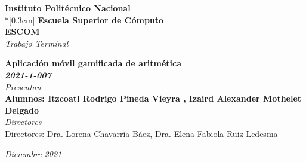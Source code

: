 \documentclass{article}
\begin{document}
\begin{titlepage}


        \begin{center}
            \huge \textbf{Instituto Politécnico Nacional}\\*[0.3cm]
            \LARGE \textbf{Escuela Superior de Cómputo}\\
            \vspace{1cm}
            \hspace{0.9cm}
            \LARGE \textbf{ESCOM}\\
            \vspace{2cm} 
            \Large \emph{Trabajo Terminal}
     
    		\LARGE \textbf{ Aplicación móvil gamificada de aritmética\\}
    		\LARGE \textbf {\emph{ 2021-1-007}} \\
    		\vspace{1cm} %
 		\emph{Presentan}\\   	
    	\textbf{Alumnos: Itzcoatl Rodrigo Pineda Vieyra , Izaird Alexander Mothelet Delgado }\\
    	\vspace{3cm}
    	\emph{Directores}\\   	
	Directores: Dra. Lorena Chavarría Báez, Dra. Elena Fabiola  Ruiz Ledesma \\
    \vspace{1cm} %
        \end{center}

    \centering %
    \vspace{1cm} %
	
	\begin{flushright}
	\emph{Diciembre 2021}
	\end{flushright}

\end{titlepage}

\tableofcontents
\pagebreak
\end{document}
